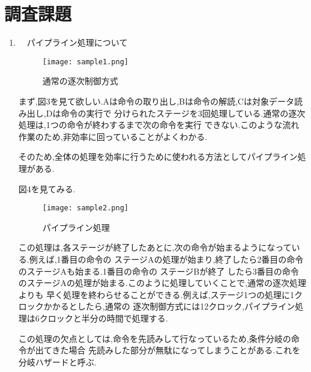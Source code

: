 \documentclass[a4paper,11pt,titlepage]{jarticle}
\begin{document}
\section{調査課題}
\begin{enumerate}
  \item　パイプライン処理について
  \par
  \begin{figure}[htbp]
  \centering
  \texttt{[image: sample1.png]}
  \label{通常の逐次制御方式}\\
  \caption{通常の逐次制御方式}
  \end{figure}
      まず,図3を見て欲しい.Aは命令の取り出し,Bは命令の解読,Cは対象データ読み出し,Dは命令の実行で
    分けられたステージを3回処理している.通常の逐次処理は,1つの命令が終わするまで次の命令を実行
    できない.このような流れ作業のため,非効率に回っていることがよくわかる.\par
  そのため,全体の処理を効率に行うために使われる方法としてパイプライン処理がある.\par
  図4を見てみる.
  \begin{figure}[htbp]
  \centering
  \texttt{[image: sample2.png]}
  \label{パイプライン処理}\\
  \caption{パイプライン処理}
  \end{figure}
\par
      この処理は,各ステージが終了したあとに,次の命令が始まるようになっている.例えば,1番目の命令の
    ステージAの処理が始まり,終了したら2番目の命令のステージAも始まる.1番目の命令の ステージBが終了
    したら3番目の命令のステージAの処理が始まる.このように処理していくことで,通常の逐次処理よりも
    早く処理を終わらせることができる.例えば,ステージ1つの処理に1クロックかかるとしたら,通常の
    逐次制御方式には12クロック,パイプライン処理は6クロックと半分の時間で処理する.\par
      この処理の欠点としては,命令を先読みして行なっているため,条件分岐の命令が出てきた場合
    先読みした部分が無駄になってしまうことがある.これを分岐ハザードと呼ぶ.


\end{enumerate}
\end{document}
